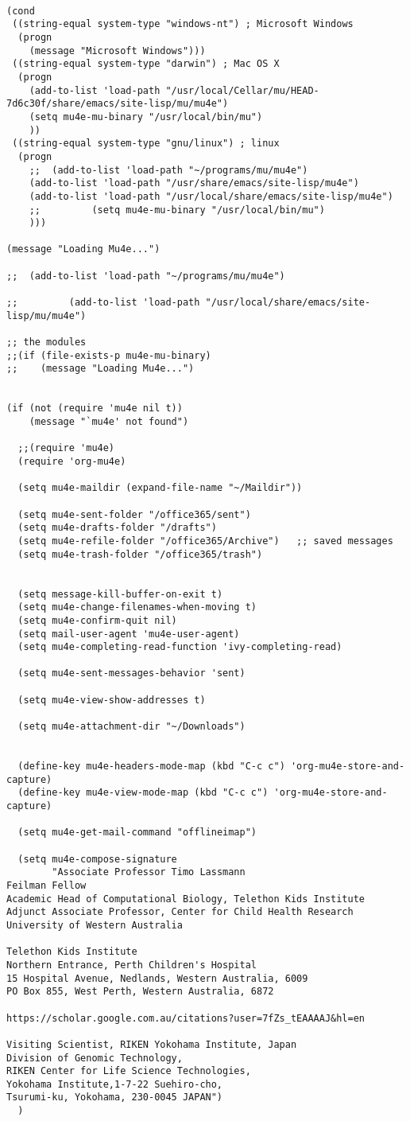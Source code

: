 \documentclass[12pt]{article}
\begin{document}
\begin{verbatim}

(cond
 ((string-equal system-type "windows-nt") ; Microsoft Windows
  (progn
    (message "Microsoft Windows")))
 ((string-equal system-type "darwin") ; Mac OS X
  (progn
    (add-to-list 'load-path "/usr/local/Cellar/mu/HEAD-7d6c30f/share/emacs/site-lisp/mu/mu4e")
    (setq mu4e-mu-binary "/usr/local/bin/mu")
    ))
 ((string-equal system-type "gnu/linux") ; linux
  (progn
    ;;  (add-to-list 'load-path "~/programs/mu/mu4e")
    (add-to-list 'load-path "/usr/share/emacs/site-lisp/mu4e")
    (add-to-list 'load-path "/usr/local/share/emacs/site-lisp/mu4e")   
    ;;         (setq mu4e-mu-binary "/usr/local/bin/mu")
    )))

(message "Loading Mu4e...")

;;  (add-to-list 'load-path "~/programs/mu/mu4e")

;;         (add-to-list 'load-path "/usr/local/share/emacs/site-lisp/mu/mu4e")   

;; the modules
;;(if (file-exists-p mu4e-mu-binary)
;;    (message "Loading Mu4e...")


(if (not (require 'mu4e nil t))
    (message "`mu4e' not found")

  ;;(require 'mu4e)
  (require 'org-mu4e)

  (setq mu4e-maildir (expand-file-name "~/Maildir"))

  (setq mu4e-sent-folder "/office365/sent")
  (setq mu4e-drafts-folder "/drafts")
  (setq mu4e-refile-folder "/office365/Archive")   ;; saved messages
  (setq mu4e-trash-folder "/office365/trash")


  (setq message-kill-buffer-on-exit t)
  (setq mu4e-change-filenames-when-moving t)
  (setq mu4e-confirm-quit nil)
  (setq mail-user-agent 'mu4e-user-agent)
  (setq mu4e-completing-read-function 'ivy-completing-read)

  (setq mu4e-sent-messages-behavior 'sent)

  (setq mu4e-view-show-addresses t)

  (setq mu4e-attachment-dir "~/Downloads")


  (define-key mu4e-headers-mode-map (kbd "C-c c") 'org-mu4e-store-and-capture)
  (define-key mu4e-view-mode-map (kbd "C-c c") 'org-mu4e-store-and-capture)

  (setq mu4e-get-mail-command "offlineimap")

  (setq mu4e-compose-signature
        "Associate Professor Timo Lassmann
Feilman Fellow
Academic Head of Computational Biology, Telethon Kids Institute
Adjunct Associate Professor, Center for Child Health Research
University of Western Australia

Telethon Kids Institute
Northern Entrance, Perth Children's Hospital
15 Hospital Avenue, Nedlands, Western Australia, 6009
PO Box 855, West Perth, Western Australia, 6872 

https://scholar.google.com.au/citations?user=7fZs_tEAAAAJ&hl=en

Visiting Scientist, RIKEN Yokohama Institute, Japan
Division of Genomic Technology,
RIKEN Center for Life Science Technologies,
Yokohama Institute,1-7-22 Suehiro-cho,
Tsurumi-ku, Yokohama, 230-0045 JAPAN")
  )
\end{verbatim}
\end{document}
